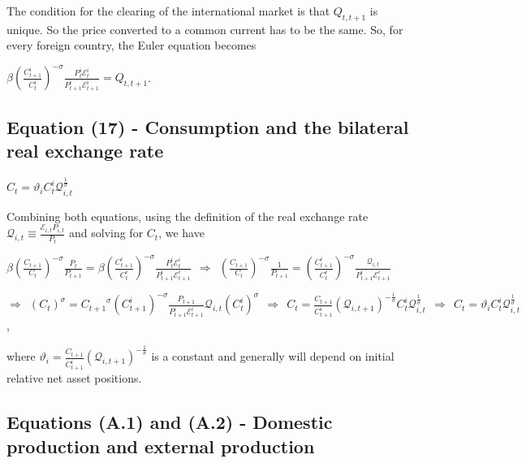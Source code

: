 \documentclass[
]{article}
\begin{document}
The condition for the clearing of the international market is that
\(Q_{t,t+1}\) is unique. So the price converted to a common current has
to be the same. So, for every foreign country, the Euler equation
becomes

\(\displaystyle \beta \left( \frac{C_{t+1}^i}{C_t^i} \right)^{-\sigma} \frac{P_t^i \mathcal{E}_t^i}{P_{t+1}^i \mathcal{E}_{t+1}^i} = Q_{t,t+1}\).

\vspace{12pt}

\hypertarget{equation-17---consumption-and-the-bilateral-real-exchange-rate}{%
\subsection{Equation (17) - Consumption and the bilateral real exchange
rate}\label{equation-17---consumption-and-the-bilateral-real-exchange-rate}}

\(C_t = \vartheta_i C_t^i \mathcal{Q}_{i,t}^\frac{1}{\sigma}\)

\vspace{8pt}

Combining both equations, using the definition of the real exchange rate
\(\displaystyle \mathcal{Q}_{i,t} \equiv \frac{\mathcal{E}_{i,t}P_{i,t}}{P_t}\)
and solving for \(C_t\), we have

\(\displaystyle \beta \left( \frac{C_{t+1}}{C_t} \right)^{-\sigma} \frac{P_t}{P_{t+1}} = \beta \left( \frac{C_{t+1}^i}{C_t^i} \right)^{-\sigma} \frac{P_t^i \mathcal{E}_t^i}{P_{t+1}^i \mathcal{E}_{t+1}^i} \ \ \Rightarrow \ \ \left( \frac{C_{t+1}}{C_t} \right)^{-\sigma} \frac{1}{P_{t+1}} = \left( \frac{C_{t+1}^i}{C_t^i} \right)^{-\sigma} \frac{\mathcal{Q}_{i,t}}{P_{t+1}^i \mathcal{E}_{t+1}^i}\)

\(\displaystyle \Rightarrow \ \ (C_t)^\sigma = {C_{t+1}}^\sigma \left( C_{t+1}^i \right)^{-\sigma} \frac{P_{t+1}}{P_{t+1}^i \mathcal{E}_{t+1}^i}\mathcal{Q}_{i,t}(C_t^i)^\sigma \ \ \Rightarrow \ \ C_t = \frac{C_{t+1}}{C_{t+1}^i} (\mathcal{Q}_{i,t+1})^{-\frac{1}{\sigma}} C_t^i \mathcal{Q}_{i,t}^\frac{1}{\sigma} \ \ \Rightarrow \ \ C_t = \vartheta_i C_t^i \mathcal{Q}_{i,t}^\frac{1}{\sigma}\),

where
\(\displaystyle \vartheta_i = \frac{C_{t+1}}{C_{t+1}^i} (\mathcal{Q}_{i,t+1})^{-\frac{1}{\sigma}}\)
is a constant and generally will depend on initial relative net asset
positions.

\vspace{12pt}

\hypertarget{equations-a.1-and-a.2---domestic-production-and-external-production}{%
\subsection{Equations (A.1) and (A.2) - Domestic production and external
production}\label{equations-a.1-and-a.2---domestic-production-and-external-production}}
\end{document}

